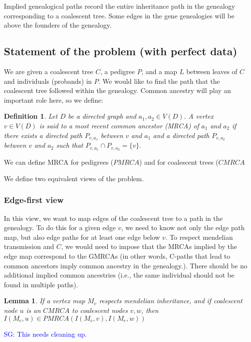 \documentclass[14pt]{extarticle}
\newtheorem{definition}{Definition}
\newtheorem{lemma}{Lemma}
\newcommand{\sgcomment}[1]{\textcolor{blue}{SG: #1}}
\begin{document}
Implied genealogical paths record the entire inheritance path in the genealogy corresponding to a coalescent tree. Some edges in the gene genealogies will be above the founders of the genealogy. 


\subsection{Statement of the problem (with perfect data)} 


We are given a coalescent tree $C$, a pedigree $P$, and a map $L$ between leaves of $C$ and individuals (probands) in  $P.$ 
We would like to find the path that the coalescent tree followed within the genealogy. Common ancestry will play an important role here, so we define: 


\begin{definition}
	Let $D$ be a directed graph and $a_1, a_2 \in V(D)$. A vertex $v \in V(D)$ is said to a most recent common ancestor (MRCA) of $a_1$ and $a_2$ if there exists 
	a directed path $P_{v,a_1}$ between $v$ and $a_1$ and a directed path $P_{v,a_2}$ between $v$ and $a_2$ such that $P_{v,a_1} \cap P_{v,a_2} = \{v\}.$	
\end{definition}

We can define MRCA for pedigrees ($PMRCA$) and for coalescent trees ($CMRCA$

We define two equivalent views of the problem. 

\subsubsection{Edge-first view}
In this view, we want to map edges of the coalescent tree to a path in the genealogy. To do this for a given edge $v$, we need to know not only the edge path map, 
but also edge paths for at least one edge below $v$. To respect mendelian transmission and $C$, we would need to impose that the MRCAs implied by the edge map 
correspond to the GMRCAs (in other words, C-paths that lead to common ancestors imply common ancestry in the genealogy.).
There should be no additional implied common ancestries (i.e., the same individual should not be found in multiple paths).  


\begin{lemma}
If a vertex map $M_v$ respects mendelian inheritance, and if coalescent node $u$ is an $CMRCA$ to coalescent nodes $v, w$, then $I (M_e, u) \in PMRCA(I(M_e,v),I(M_e,w))$   
\end{lemma}
\sgcomment{This needs cleaning up.}
\end{document}
